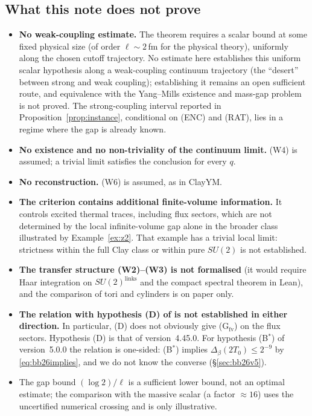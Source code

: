 \documentclass[11pt,a4paper]{article}
\theoremstyle{plain}
\theoremstyle{definition}
\theoremstyle{remark}
\numberwithin{equation}{section}
\begin{document}
\subsection{What this note does not prove}\label{sec:notprove}
\begin{itemize}
\item \textbf{No weak-coupling estimate.} The theorem requires a scalar bound at some fixed physical size (of order $\ell\sim2$\,fm
for the physical theory), uniformly along the chosen cutoff trajectory. No estimate here establishes this uniform scalar hypothesis along a weak-coupling continuum trajectory (the ``desert'' between strong and weak coupling); establishing it remains an open sufficient route, and equivalence with the Yang--Mills existence and mass-gap problem is not proved. The strong-coupling interval reported in Proposition~\ref{prop:instance}, conditional on (ENC) and (RAT), lies in a regime where the gap is already known.
\item \textbf{No existence and no non-triviality of the continuum limit.} (W4) is assumed; a trivial limit satisfies the conclusion
for every $q$.
\item \textbf{No reconstruction.} (W6) is assumed, as in ClayYM.
\item \textbf{The criterion contains additional finite-volume information.} It controls excited thermal traces, including flux
sectors, which are not determined by the local infinite-volume gap alone in the broader class illustrated by Example~\ref{ex:z2}. That example
has a trivial local limit: strictness within the full Clay class or within pure $SU(2)$ is not established.
\item \textbf{The transfer structure (W2)--(W3) is not formalised} (it would require Haar integration on $SU(2)^{\text{links}}$ and the
compact spectral theorem in Lean), and the comparison of tori and cylinders is on paper only.
\item \textbf{The relation with hypothesis (D) of \cite{BB26} is not established in either direction.} In particular, (D) does not
obviously give (G$_{\mathrm{fv}}$) on the flux sectors. Hypothesis (D) is that of version~4.45.0. For hypothesis (B$^*$) of version~5.0.0
\cite{BB26v5} the relation is one-sided: (B$^*$) implies $\Delta_\beta(2T_0)\le2^{-9}$ by \eqref{eq:bb26implies}, and we do not know the
converse (\S\ref{sec:bb26v5}).
\item The gap bound $(\log2)/\ell$ is a sufficient lower bound, not an optimal estimate; the comparison with the massive scalar (a factor
$\approx16$) uses the uncertified numerical crossing and is only illustrative.
\end{itemize}
\end{document}

